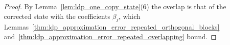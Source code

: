 \begin{proof}
    \leanok
    By Lemma~\ref{lem:ldp_one_copy_state}(6) the overlap is that of the corrected state
    with the coefficients $\beta_j$, which
    Lemmas~\ref{thm:ldp_approximation_error_repeated_orthogonal_blocks}
    and~\ref{thm:ldp_approximation_error_repeated_overlapping} bound.
\end{proof}

